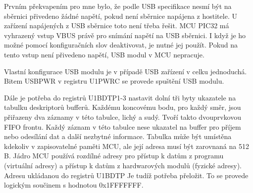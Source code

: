 Prvním překvapením pro mne bylo, že podle USB specifikace nesmí být na sběrnici přivedeno žádné napětí, pokud není sběrnice napájena z hostitele. U zařízení napájených z USB sběrnice toto není třeba řešit. MCU PIC32 má vyhrazený vstup VBUS právě pro snímání napětí na USB sběrnici. I když je ho možné pomocí konfiguračních slov deaktivovat, je nutné jej použít. Pokud na tento vstup není přivedeno napětí, USB modul v MCU nepracuje.

Vlastní konfigurace USB modulu je v případě USB zařízení v celku jednoduchá. Bitem USBPWR v registru U1PWRC se provede spuštění USB modulu. 

Dále je potřeba do registrů U1BDTP1-3 nastavit dolní tři byty ukazatele na tabulku deskriptorů bufferů. Každému koncovému bodu, pro každý směr, jsou přiřazeny dva záznamy v této tabulce, lichý a sudý. Tvoří takto dvouprvkovou FIFO frontu.  Každý záznam v této tabulce nese ukazatel na buffer pro příjem nebo odesílání dat a další nezbytné informace. Tabulka může být umístěna kdekoliv v zapisovatelné paměti MCU, ale její adresa musí být zarovnaná na 512 B. Jádro MCU používá rozdílné adresy pro přístup k datům z programu (virtuální adresy) a přístup k datům z hardwarových modulů (fyzické adresy). Adresu ukládanou do registrů U1BDTP Je tudíž potřeba přeložit. To se provede logickým součinem s hodnotou 0x1FFFFFFF.



